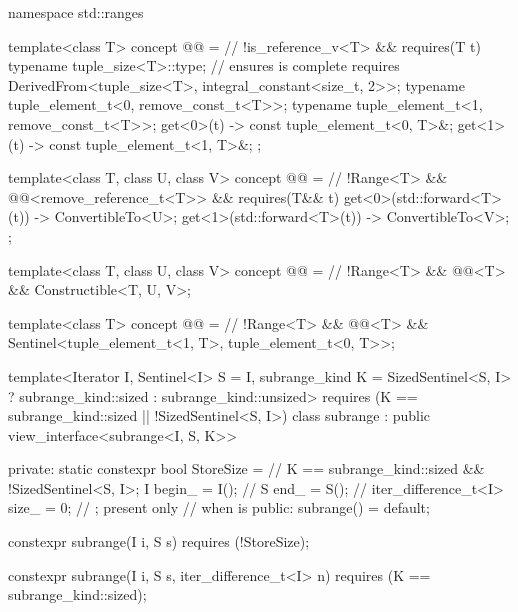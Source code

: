 %
\begin{codeblock}
namespace std::ranges {
  template<class T>
    concept @@ =                                 // \expos
      !is_reference_v<T> && requires(T t) {
        typename tuple_size<T>::type;   // ensures  is complete
        requires DerivedFrom<tuple_size<T>, integral_constant<size_t, 2>>;
        typename tuple_element_t<0, remove_const_t<T>>;
        typename tuple_element_t<1, remove_const_t<T>>;
        { get<0>(t) } -> const tuple_element_t<0, T>&;
        { get<1>(t) } -> const tuple_element_t<1, T>&;
      };

  template<class T, class U, class V>
    concept @@ =                  // \expos
      !Range<T> && @@<remove_reference_t<T>> &&
      requires(T&& t) {
        { get<0>(std::forward<T>(t)) } -> ConvertibleTo<U>;
        { get<1>(std::forward<T>(t)) } -> ConvertibleTo<V>;
      };

  template<class T, class U, class V>
    concept @@ =                // \expos
      !Range<T> && @@<T> && Constructible<T, U, V>;

  template<class T>
    concept @@ =                    // \expos
      !Range<T> && @@<T> &&
      Sentinel<tuple_element_t<1, T>, tuple_element_t<0, T>>;

  template<Iterator I, Sentinel<I> S = I, subrange_kind K =
      SizedSentinel<S, I> ? subrange_kind::sized : subrange_kind::unsized>
    requires (K == subrange_kind::sized || !SizedSentinel<S, I>)
  class subrange : public view_interface<subrange<I, S, K>> {
  private:
    static constexpr bool StoreSize =                   // \expos
      K == subrange_kind::sized && !SizedSentinel<S, I>;
    I begin_ = I();                                     // \expos
    S end_ = S();                                       // \expos
    iter_difference_t<I> size_ = 0;                     // \expos; present only
                                                        // when  is 
  public:
    subrange() = default;

    constexpr subrange(I i, S s) requires (!StoreSize);

    constexpr subrange(I i, S s, iter_difference_t<I> n)
      requires (K == subrange_kind::sized);

}}
\end{codeblock}
